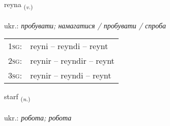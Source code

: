 \documentclass[frontgrid, backgrid]{flacards}\usepackage[]{graphicx}\usepackage[]{xcolor}
\begin{document}
\renewcommand{\flhead}{\vskip5pt \fboxsep=0pt {\small\bfseries\footnotesize Sagnorð | дієслово}}
\renewcommand{\fcfoot}{\vskip5pt \fboxsep=0pt \hspace{2pt}{\small\bfseries\footnotesize 1K}}

\renewcommand{\blhead}{\vskip5pt {\small\bfseries\footnotesize Sagnorð | дієслово }}
\renewcommand{\bcfoot}{\vskip5pt \hspace{2pt}{\small\bfseries\footnotesize 1K}}


{reyna \small{\textsubscript{(\textit{v.})}} \\[1ex] %
\textphonetic{[reiːna]} \\
ukr.: \emph{пробувати; намагатися / пробувати / спроба} \\  [2ex]
\renewcommand*{\arraystretch}{0.8}
\begin{tabular}{p{1cm}l}
\textsc{1sg}: & reyni -- reyndi -- reynt \\ 
\textsc{2sg}: & reynir -- reyndir -- reynt \\ 
\textsc{3sg}: & reynir -- reyndi -- reynt \\ 
\end{tabular}
}

\renewcommand{\flhead}{\vskip5pt \fboxsep=0pt {\small\bfseries\footnotesize Nafnorð | іменник}}
\renewcommand{\fcfoot}{\vskip5pt \fboxsep=0pt \hspace{2pt}{\small\bfseries\footnotesize 1K}}

\renewcommand{\blhead}{\vskip5pt {\small\bfseries\footnotesize Nafnorð | іменник }}
\renewcommand{\bcfoot}{\vskip5pt \hspace{2pt}{\small\bfseries\footnotesize 1K}}


{starf \small{\textsubscript{(\textit{n.})}} \\[1ex] %
\textphonetic{[starv]} \\
ukr.: \emph{робота; робота} \\  [2ex]
\renewcommand*{\arraystretch}{0.8}
}
\end{document}
